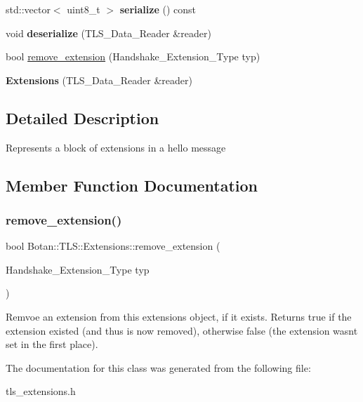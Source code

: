 \begin{DoxyCompactItemize}
std\+::vector$<$ uint8\+\_\+t $>$ {\bfseries serialize} () const
\item 
\mbox{\label{class_botan_1_1_t_l_s_1_1_extensions_aeeada6e5f3b71c9cd0fdceb594533819}} 
void {\bfseries deserialize} (T\+L\+S\+\_\+\+Data\+\_\+\+Reader \&reader)
\item 
bool \hyperlink{class_botan_1_1_t_l_s_1_1_extensions_a4adf35cd9f8155846e973c104e72703b}{remove\+\_\+extension} (Handshake\+\_\+\+Extension\+\_\+\+Type typ)
\item 
\mbox{\label{class_botan_1_1_t_l_s_1_1_extensions_a34cc01c87e8ec2f49a941bedae2422bc}} 
{\bfseries Extensions} (T\+L\+S\+\_\+\+Data\+\_\+\+Reader \&reader)
\end{DoxyCompactItemize}


\subsection{Detailed Description}
Represents a block of extensions in a hello message 

\subsection{Member Function Documentation}
\mbox{\label{class_botan_1_1_t_l_s_1_1_extensions_a4adf35cd9f8155846e973c104e72703b}} 
\subsubsection{\texorpdfstring{remove\+\_\+extension()}{remove\_extension()}}
{\footnotesize\ttfamily bool Botan\+::\+T\+L\+S\+::\+Extensions\+::remove\+\_\+extension (\begin{DoxyParamCaption}\item[{Handshake\+\_\+\+Extension\+\_\+\+Type}]{typ }\end{DoxyParamCaption})}

Remvoe an extension from this extensions object, if it exists. Returns true if the extension existed (and thus is now removed), otherwise false (the extension wasn\textquotesingle{}t set in the first place). 

The documentation for this class was generated from the following file\+:\begin{DoxyCompactItemize}
\item 
tls\+\_\+extensions.\+h\end{DoxyCompactItemize}
